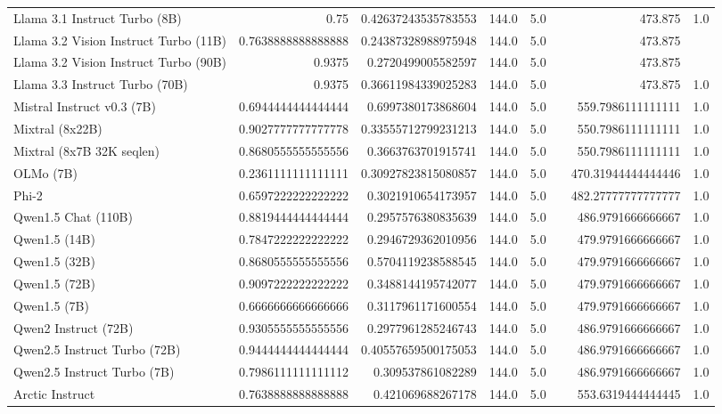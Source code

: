 \begin{table}[htp]
{\begin{tabular}{lrrrrrrr}
Llama 3.1 Instruct Turbo (8B) & 0.75 & 0.42637243535783553 & 144.0 & 5.0 &  & 473.875 & 1.0 \\
Llama 3.2 Vision Instruct Turbo (11B) & 0.7638888888888888 & 0.24387328988975948 & 144.0 & 5.0 &  & 473.875 &  \\
Llama 3.2 Vision Instruct Turbo (90B) & 0.9375 & 0.2720499005582597 & 144.0 & 5.0 &  & 473.875 &  \\
Llama 3.3 Instruct Turbo (70B) & 0.9375 & 0.36611984339025283 & 144.0 & 5.0 &  & 473.875 & 1.0 \\
Mistral Instruct v0.3 (7B) & 0.6944444444444444 & 0.6997380173868604 & 144.0 & 5.0 &  & 559.7986111111111 & 1.0 \\
Mixtral (8x22B) & 0.9027777777777778 & 0.33555712799231213 & 144.0 & 5.0 &  & 550.7986111111111 & 1.0 \\
Mixtral (8x7B 32K seqlen) & 0.8680555555555556 & 0.3663763701915741 & 144.0 & 5.0 &  & 550.7986111111111 & 1.0 \\
OLMo (7B) & 0.2361111111111111 & 0.30927823815080857 & 144.0 & 5.0 &  & 470.31944444444446 & 1.0 \\
Phi-2 & 0.6597222222222222 & 0.3021910654173957 & 144.0 & 5.0 &  & 482.27777777777777 & 1.0 \\
Qwen1.5 Chat (110B) & 0.8819444444444444 & 0.2957576380835639 & 144.0 & 5.0 &  & 486.9791666666667 & 1.0 \\
Qwen1.5 (14B) & 0.7847222222222222 & 0.2946729362010956 & 144.0 & 5.0 &  & 479.9791666666667 & 1.0 \\
Qwen1.5 (32B) & 0.8680555555555556 & 0.5704119238588545 & 144.0 & 5.0 &  & 479.9791666666667 & 1.0 \\
Qwen1.5 (72B) & 0.9097222222222222 & 0.3488144195742077 & 144.0 & 5.0 &  & 479.9791666666667 & 1.0 \\
Qwen1.5 (7B) & 0.6666666666666666 & 0.3117961171600554 & 144.0 & 5.0 &  & 479.9791666666667 & 1.0 \\
Qwen2 Instruct (72B) & 0.9305555555555556 & 0.2977961285246743 & 144.0 & 5.0 &  & 486.9791666666667 & 1.0 \\
Qwen2.5 Instruct Turbo (72B) & 0.9444444444444444 & 0.40557659500175053 & 144.0 & 5.0 &  & 486.9791666666667 & 1.0 \\
Qwen2.5 Instruct Turbo (7B) & 0.7986111111111112 & 0.309537861082289 & 144.0 & 5.0 &  & 486.9791666666667 & 1.0 \\
Arctic Instruct & 0.7638888888888888 & 0.421069688267178 & 144.0 & 5.0 &  & 553.6319444444445 & 1.0 \\

\end{tabular}}
\end{table}
